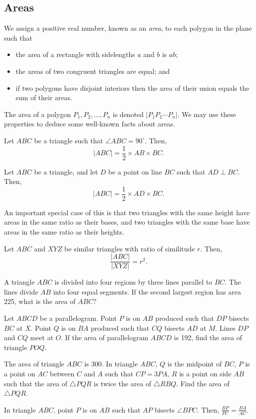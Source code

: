 \subsection{Areas}
We assign a positive real number, known as an \emph{area}, to each polygon in
the plane such that
\begin{itemize}
  \item the area of a rectangle with sidelengths $a$ and $b$ is $ab$;
  \item the areas of two congruent triangles are equal; and
  \item if two polygons have disjoint interiors then the area of their union
    equals the sum of their areas.
\end{itemize}
The area of a polygon $P_1,P_2,\ldots,P_n$ is denoted $|P_1P_2\cdots P_n|$. We
may use these properties to deduce some well-known facts about areas.
\begin{result}{\label{r:b:g:a:1}}
  Let $ABC$ be a triangle such that $\angle ABC=90^\circ$. Then,
  \[|ABC|=\frac 12\times AB\times BC.\]
\end{result}
\begin{result}{\label{r:b:g:a:2}}
  Let $ABC$ be a triangle, and let $D$ be a point on line $BC$ such that
  $AD\perp BC$. Then,
  \[|ABC|=\frac 12\times AD\times BC.\]
\end{result}
An important special case of this is that two triangles with the same height
have areas in the same ratio as their bases, and two triangles with the same
base have areas in the same ratio as their heights.
\begin{result}{\label{r:b:g:a:3}}
  Let $ABC$ and $XYZ$ be similar triangles with ratio of similitude $r$. Then,
  \[\frac{|ABC|}{|XYZ|}=r^2.\]
\end{result}
\begin{problem}{\label{p:b:g:a:1}}
  A triangle $ABC$ is divided into four regions by three lines parallel to $BC$.
  The lines divide $AB$ into four equal segments. If the second largest region
  has area 225, what is the area of $ABC$?
\end{problem}
\begin{problem}{\label{p:b:g:a:2}}
  Let $ABCD$ be a parallelogram. Point $P$ is on $AB$ produced such that $DP$
  bisects $BC$ at $X$. Point $Q$ is on $BA$ produced such that $CQ$ bisects $AD$
  at $M$. Lines $DP$ and $CQ$ meet at $O$. If the area of parallelogram $ABCD$
  is 192, find the area of triangle $POQ$.
\end{problem}
\begin{problem}{\label{p:b:g:a:3}}
  The area of triangle $ABC$ is 300. In triangle $ABC$, $Q$ is the midpoint of
  $BC$, $P$ is a point on $AC$ between $C$ and $A$ such that $CP=3PA$, $R$ is a
  point on side $AB$ such that the area of $\triangle PQR$ is twice the area of
  $\triangle RBQ$. Find the area of $\triangle PQR$.
\end{problem}
\begin{result}{\label{r:b:g:a:4}}
  In triangle $ABC$, point $P$ is on $AB$ such that $AP$ bisects $\angle BPC$.
  Then, $\frac{BP}{PC}=\frac{BA}{AC}$.
\end{result}
